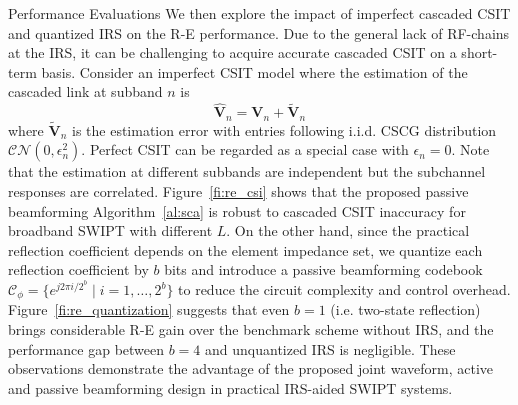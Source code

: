 \documentclass[journal]{IEEEtran}
\begin{document}
\begin{section}{Performance Evaluations}
		We then explore the impact of imperfect cascaded CSIT and quantized IRS on the R-E performance. Due to the general lack of RF-chains at the IRS, it can be challenging to acquire accurate cascaded CSIT on a short-term basis. Consider an imperfect CSIT model where the estimation of the cascaded link at subband $n$ is
		\begin{equation}
			\hat{\boldsymbol{V}}_{n} = \boldsymbol{V}_{n} + \tilde{\boldsymbol{V}}_{n}
		\end{equation}
		where $\tilde{\boldsymbol{V}}_{n}$ is the estimation error with entries following i.i.d. CSCG distribution $\mathcal{CN}(0, \epsilon_{n}^2)$. Perfect CSIT can be regarded as a special case with $\epsilon_{n}=0$. Note that the estimation at different subbands are independent but the subchannel responses are correlated. Figure~\ref{fi:re_csi} shows that the proposed passive beamforming Algorithm~\ref{al:sca} is robust to cascaded CSIT inaccuracy for broadband SWIPT with different $L$. On the other hand, since the practical reflection coefficient depends on the element impedance set, we quantize each reflection coefficient by $b$ bits and introduce a passive beamforming codebook $\mathcal{C}_\phi = \{e^{j 2 \pi i / 2^b} \mid i = 1, \dots, 2^b\}$ to reduce the circuit complexity and control overhead. Figure~\ref{fi:re_quantization} suggests that even $b=1$ (i.e. two-state reflection) brings considerable R-E gain over the benchmark scheme without IRS, and the performance gap between $b=4$ and unquantized IRS is negligible. These observations demonstrate the advantage of the proposed joint waveform, active and passive beamforming design in practical IRS-aided SWIPT systems.
	\end{section}
\end{document}
